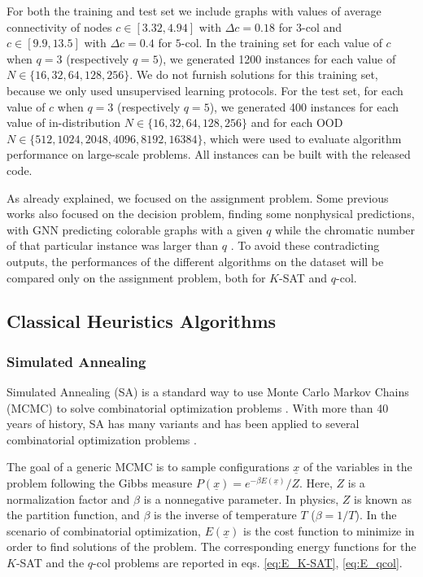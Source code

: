 \documentclass{article}
\begin{document}
For both the training and test set we include graphs with values of average connectivity of nodes $c \in [3.32, 4.94]$ with $\Delta c=0.18$ for $3$-col and $c \in [9.9, 13.5]$ with $\Delta c=0.4$ for $5$-col. In the training set for each value of $c$ when $q=3$ (respectively $q=5$), we generated 1200 instances for each value of $N \in \{16, 32, 64, 128, 256\}$. We do not furnish solutions for this training set, because we only used unsupervised learning protocols.
For the test set, for each value of $c$ when $q=3$ (respectively $q=5$), we generated 400 instances for each value of in-distribution $N \in \{16, 32, 64, 128, 256\}$ and for each OOD $N \in \{512, 1024, 2048, 4096, 8192, 16384\}$, which were used to evaluate algorithm performance on large-scale problems. All instances can be built with the released code.

As already explained, we focused on the assignment problem. Some previous works also focused on the decision problem, finding some nonphysical predictions, with GNN predicting colorable graphs with a given $q$ while the chromatic number of that particular instance was larger than $q$ \cite{lemos2019graph}. To avoid these contradicting outputs, the performances of the different algorithms on the dataset will be compared only on the assignment problem, both for $K$-SAT and $q$-col.

\subsection{Classical Heuristics Algorithms} \label{sec:classicAlg}

\subsubsection{Simulated Annealing}

Simulated Annealing (SA) is a standard way to use Monte Carlo Markov Chains (MCMC) to solve combinatorial optimization problems \cite{KirkpatrickSA1983}. With more than 40 years of history, SA has many variants \cite{EgleseSimAnn1990, GuilmeauSimAnn2021} and has been applied to several combinatorial optimization problems \cite{KirkpatrickSA1983, zdeborova2010generalization, krzakala2013performance, Budzynski_2019, mariachiara_indset_PRE_2019, mariachiara_SA_col_2023}.

The goal of a generic MCMC is to sample configurations $\underline{x}$ of the variables in the problem following the Gibbs measure $P(\underline{x}) = e^{-\beta E(\underline{x})} / Z$. Here, $Z$ is a normalization factor and $\beta$ is a nonnegative parameter. In physics, $Z$ is known as the partition function, and $\beta$ is the inverse of temperature $T$ ($\beta=1/T$). In the scenario of combinatorial optimization, $E(\underline{x})$ is the cost function to minimize in order to find solutions of the problem. The corresponding energy functions for the $K$-SAT and the $q$-col problems are reported in eqs. \eqref{eq:E_K-SAT}, \eqref{eq:E_qcol}. 
\end{document}
